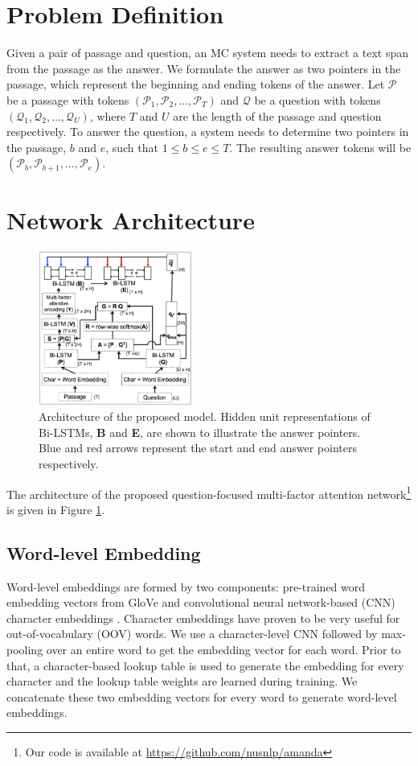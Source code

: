 \documentclass[letterpaper]{article}
\begin{document}
\section{Problem Definition}
\label{sec:prob_def}
Given a pair of passage and question, an MC system needs to extract a text span from the passage as the answer. We formulate the answer as two pointers in the passage, which represent the beginning and ending tokens of the answer. Let $\mathcal{P}$ be a passage with tokens $(\mathcal{P}_1, \mathcal{P}_2, \ldots, \mathcal{P}_T)$ and $\mathcal{Q}$ be a question with tokens $(\mathcal{Q}_1,\mathcal{Q}_2, \ldots, \mathcal{Q}_U)$, where $T$ and $U$ are the length of the passage and question respectively. To answer the question, a system needs to determine two pointers in the passage, $b$ and $e$, such that $1 \leq b \leq e \leq T$. The resulting answer tokens will be $(\mathcal{P}_b, \mathcal{P}_{b+1}, \ldots, \mathcal{P}_e)$.

\section{Network Architecture}
\label{sec:network}
\begin{figure}[t]
\centering
\includegraphics[width=0.45\textwidth]{amandasystem.png}
\caption{Architecture of the proposed model. Hidden unit representations of Bi-LSTMs, \textbf{B} and \textbf{E}, are shown to illustrate the answer pointers. Blue and red arrows represent the start and end answer pointers respectively.}
\label{fig:squad_system_block}
\end{figure}
The architecture of the proposed question-focused multi-factor attention network\footnote{Our code is available at \url{https://github.com/nusnlp/amanda}}
is given in Figure \ref{fig:squad_system_block}.
\subsection{Word-level Embedding}
Word-level embeddings are formed by two components: pre-trained word embedding vectors from GloVe \cite{pennington2014glove} and convolutional neural network-based (CNN) character embeddings \cite{cnn_char_emb_kim2014}.
Character embeddings have proven to be very useful for out-of-vocabulary (OOV) words.
We use a character-level CNN followed by max-pooling over an entire word to get the embedding vector for each word. Prior to that, a character-based lookup table is used to generate the embedding for every character and the lookup table weights are learned during training. We concatenate these two embedding vectors for every word to generate word-level embeddings.
\end{document}
